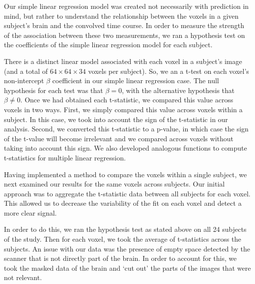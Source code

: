 \par \indent Our simple linear regression model was created not necessarily with prediction in mind, but rather to understand the relationship between the voxels in a given subject's brain and the convolved time course. In order to measure the strength of the association between these two measurements, we ran a hypothesis test on the coefficients of the simple linear regression model for each subject.

\par There is a distinct linear model associated with each voxel in a subject’s image (and a total of $64 \times 64 \times 34$ voxels per subject). So, we an a t-test on each voxel's non-intercept $\beta$ coefficient in our simple linear regression case. The null hypothesis for each test was that $\beta = 0$, with the alternative hypothesis that $\beta \neq 0$. Once we had obtained each t-statistic, we compared this value across voxels in two ways. First, we simply compared this value across voxels within a subject. In this case, we took into account the sign of the t-statistic in our analysis. Second, we converted this t-statistic to a p-value, in which case the sign of the t-value will become irrelevant and we compared across voxels without taking into account this sign.  We also developed analogous functions to compute t-statistics for multiple linear regression. 

\par Having implemented a  method to compare the voxels within a single subject, we next examined our results for the same voxels across subjects. Our initial approach was to aggregate the t-statistic data between all subjects for each voxel. This allowed us to decrease the variability of the fit on each voxel and detect a more clear signal. 

\par In order to do this, we ran the hypothesis test as stated above on all 24 subjects of the study. Then for each voxel, we took the average of t-statistics across the subjects. An issue with our data was the presence of empty space detected by the scanner that is not directly part of the brain. In order to account for this, we took the masked data of the brain and ‘cut out’ the parts of the images that were not relevant. 
